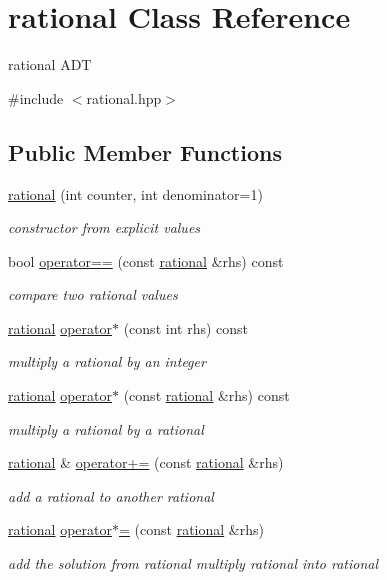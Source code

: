 \hypertarget{classrational}{}\section{rational Class Reference}
\label{classrational}


rational A\+DT  




{\ttfamily \#include $<$rational.\+hpp$>$}

\subsection*{Public Member Functions}
\begin{DoxyCompactItemize}
\item 
\hyperlink{classrational_a5f971ef33181044f54d8e4fee71cb957}{rational} (int counter, int denominator=1)
\begin{DoxyCompactList}\small\item\em constructor from explicit values \end{DoxyCompactList}\item 
bool \hyperlink{classrational_a5f9a93cc7fd6309f5eae4c76d81f28d5}{operator==} (const \hyperlink{classrational}{rational} \&rhs) const 
\begin{DoxyCompactList}\small\item\em compare two rational values \end{DoxyCompactList}\item 
\hyperlink{classrational}{rational} \hyperlink{classrational_acbaf4f76b2caf4aafb850202e29d69ce}{operator$\ast$} (const int rhs) const 
\begin{DoxyCompactList}\small\item\em multiply a rational by an integer \end{DoxyCompactList}\item 
\hyperlink{classrational}{rational} \hyperlink{classrational_a13f267e5cdafffcc44203762548bb5cd}{operator$\ast$} (const \hyperlink{classrational}{rational} \&rhs) const 
\begin{DoxyCompactList}\small\item\em multiply a rational by a rational \end{DoxyCompactList}\item 
\hyperlink{classrational}{rational} \& \hyperlink{classrational_a9b83ad0c803d2ac242b42e71d954a356}{operator+=} (const \hyperlink{classrational}{rational} \&rhs)
\begin{DoxyCompactList}\small\item\em add a rational to another rational \end{DoxyCompactList}\item 
\hyperlink{classrational}{rational} \hyperlink{classrational_a2b5729aef261d16cd18ff7c7fcbf8c6e}{operator$\ast$=} (const \hyperlink{classrational}{rational} \&rhs)
\begin{DoxyCompactList}\small\item\em add the solution from rational multiply rational into rational \end{DoxyCompactList}\end{DoxyCompactItemize}
